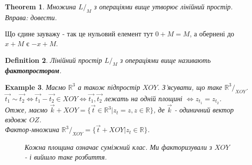 \documentclass[a4paper, 10pt]{article}
\theoremstyle{theoremdd}
\newtheorem{theorem}{Theorem}[subsection]
\newtheorem{definition}[theorem]{Definition}
\newtheorem{example}[theorem]{Example}
\begin{document}
	\begin{theorem}
	Множина $L/_{M}$ з операціями вище утворює лінійний простір.\\
	\textit{Вправа: довести.}
	\end{theorem}
	
	\noindent
	Що єдине зауважу - так це нульовий елемент тут $0+M=M$, а обернені до $x+M$ є $-x+M$.
	
	\begin{definition}
	Лінійний простір $L/_{M}$ з операціями вище називають \textbf{фактопростором}.
	\end{definition}
	
	\begin{example}
	Маємо $\mathbb{R}^3$ а також підпростір $XOY$. З'ясувати, що таке $\mathbb{R}^3/_{XOY}$.\\
	$\vec{t_1} \sim \vec{t_2} \iff \vec{t_1}-\vec{t_2} \in XOY \iff \vec{t_1}, \vec{t_2}$ лежать на одній площині $\iff z_{t_1} = z_{t_2}$.\\
	Отже, маємо $\vec{k}+XOY = \{ \vec{t} \in \mathbb{R}^3 | z_{t} = z, z \in \mathbb{R} \}$, де $\vec{k}$ - одиничний вектор вздовж $OZ$.\\
	Фактор-множина $\mathbb{R}^3/_{XOY} = \{\vec{t}+XOY | z_t \in \mathbb{R} \}$.
	\begin{figure}[H]
	\centering
	\caption*{Кожна площина означає суміжний клас. Ми факторизували з $XOY$ - і вийшло таке розбиття.}
	\end{figure}
	\end{example}
\end{document}
